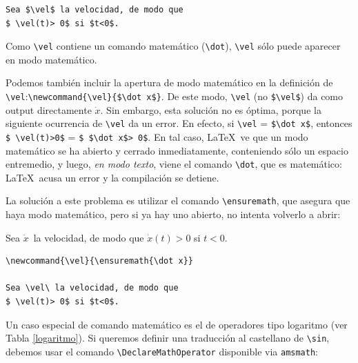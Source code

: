 {{\begin{minipage}[t]{5cm}
\begin{verbatim}
Sea $\vel$ la velocidad, de modo que 
$ \vel(t)> 0$ si $t<0$. 
\end{verbatim}
\end{minipage}
}
\vspace{.3cm}

Como \verb+\vel+ contiene un comando matem\'atico (\verb+\dot+),
\verb+\vel+ s\'olo puede aparecer en modo matem\'atico.

Podemos tambi\'en incluir la apertura de modo matem\'atico en la
definici\'on de \verb+\vel+:\linebreak\verb+\newcommand{\vel}{$\dot x$}+. De
este modo, \verb+\vel+ (no \verb+$\vel$+) 
da como output directamente $\dot x$. Sin
embargo, esta soluci\'on no es \'optima, porque la siguiente
ocurrencia de \verb+\vel+ da un error. En efecto, si \verb+\vel+ =
\verb+$\dot x$+, entonces \verb+$ \vel(t)>0$+ = 
\verb+$ $\dot x$> 0$+. 
En tal caso, \LaTeX\ ve que un modo matem\'atico se ha abierto y
cerrado inmediatamente, conteniendo s\'olo un espacio entremedio, y
luego, {\em en modo texto}, viene el comando \verb+\dot+, que es
matem\'atico: \LaTeX\ acusa un error y la compilaci\'on se detiene. 

La soluci\'on a este problema es utilizar el comando
\verb+\ensuremath+, que asegura que haya modo matem\'atico, pero si ya
hay uno abierto, no intenta volverlo a abrir:

\vspace{.3cm}
{\small
\begin{minipage}[t]{5cm}
\newcommand{\vel}{\ensuremath{\dot x}}

Sea \vel\ la velocidad, de modo que $\vel(t)> 0$ si $t<0$. 
\end{minipage}
\hspace{1.5cm}
\begin{minipage}[t]{5cm}
\begin{verbatim}
\newcommand{\vel}{\ensuremath{\dot x}}

Sea \vel\ la velocidad, de modo que 
$ \vel(t)> 0$ si $t<0$. 
\end{verbatim}
\end{minipage}
}
\vspace{.3cm}

Un caso especial de comando matem\'atico es el de operadores tipo
logaritmo (ver Tabla \ref{logaritmo}). Si queremos definir una
traducci\'on al castellano de \verb+\sin+, debemos usar el comando
\verb+\DeclareMathOperator+ disponible via \verb+amsmath+:

\vspace{.3cm}
{\small
\begin{minipage}[t]{5cm}


\end{minipage}}}
